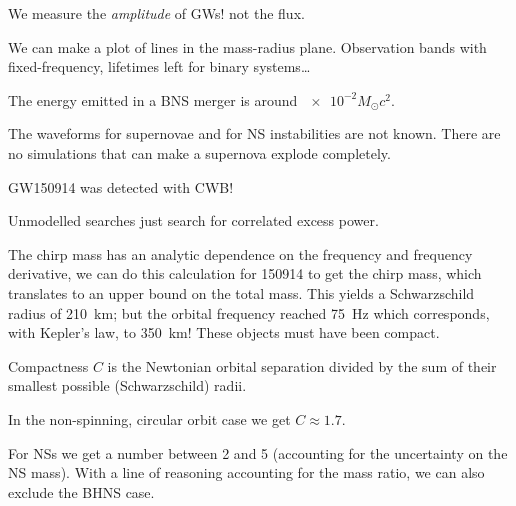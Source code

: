 \documentclass[main.tex]{subfiles}
\begin{document}
We measure the \emph{amplitude} of GWs! not the flux. 

We can make a plot of lines in the mass-radius plane. 
Observation bands with fixed-frequency, lifetimes left for binary systems\dots

The energy emitted in a BNS merger is around \(\num{e-2} M_{\odot} c^2\). 

The waveforms for supernovae and for NS instabilities are not known. 
There are no simulations that can make a supernova explode completely. 

GW150914 was detected with CWB! 

Unmodelled searches just search for correlated excess power. 


The chirp mass has an analytic dependence on the frequency and frequency derivative, 
we can do this calculation for 150914 to get the chirp mass, which translates to 
an upper bound on the total mass. This yields a Schwarzschild radius of \SI{210}{km}; 
but the orbital frequency reached \SI{75}{Hz} which corresponds, with Kepler's law, 
to \SI{350}{km}! 
These objects must have been compact. 

Compactness \(C\) is the Newtonian orbital separation divided by the sum of their smallest possible (Schwarzschild) radii. 

In the non-spinning, circular orbit case we get \(C \approx 1.7\). 

For NSs we get a number between 2 and 5 (accounting for the uncertainty on the NS mass). 
With a line of reasoning accounting for the mass ratio, we can also exclude the BHNS case. 
\end{document}
